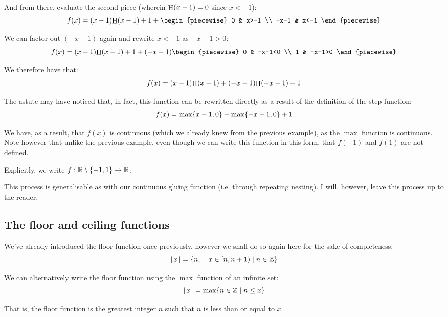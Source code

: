 \begin{example}
    And from there, evaluate the second piece (wherein $\mathrm{\mathop{H}}(x-1)=0$ since $x<-1$):
    $$
        f(x) = (x-1)\step{x-1}+1+\begin{piecewise}
            0 & x>-1 \\
            -x-1 & x<-1
        \end{piecewise}
    $$

    We can factor out $(-x-1)$ again and rewrite $x<-1$ as $-x-1>0$:
    $$
        f(x) = (x-1)\step{x-1}+1+(-x-1)\begin{piecewise}
            0 & -x-1<0 \\
            1 & -x-1>0
        \end{piecewise}
    $$
    \addtocounter{example}{-1}

    We therefore have that:
    $$
        f(x) = (x-1)\mathrm{\mathop{H}}(x-1)+(-x-1)\mathrm{\mathop{H}}(-x-1)+1
    $$

    The astute may have noticed that, in fact, this function can be rewritten directly as a result of the definition of the step function:
    $$
        f(x) = \max\{x-1,0\}+\max\{-x-1,0\}+1
    $$

    We have, as a result, that $f(x)$ is continuous (which we already knew from the previous example), as the $\max$ function is continuous. Note however that unlike the previous example, even though we can write this function in this form, that $f(-1)$ and $f(1)$ are not defined.

    Explicitly, we write $f:\mathbb{R}\setminus\{-1,1\}\to\mathbb{R}$.
\end{example}

This process is generalisable as with our continuous gluing function (i.e. through repeating nesting). I will, however, leave this process up to the reader.

\subsection{The floor and ceiling functions}
We've already introduced the floor function once previously, however we shall do so again here for the sake of completeness:
$$
\lfloor x\rfloor=\{n,\quad x\in[n,n+1)\mid n\in\mathbb{Z}\}
$$

We can alternatively write the floor function using the $\max$ function of an infinite set:
$$
\lfloor x\rfloor=\max\{n\in\mathbb{Z}\mid n\leq x\}
$$

That is, the floor function is the greatest integer $n$ such that $n$ is less than or equal to $x$.

